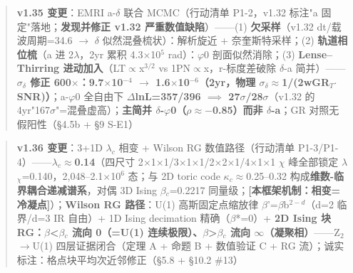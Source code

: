 \documentclass[UTF8,fontset=windows]{csoarticle}
\newcommand{\mtag}[1]{\textbf{[#1]}}
\newcommand{\up}[1]{\ensuremath{^{#1}}}
\newcommand{\down}[1]{\ensuremath{_{#1}}}
\begin{document}
\begin{quote}
\textbf{v1.35 变更}：EMRI a-\ensuremath{\delta} 联合 MCMC（行动清单 P1-2，v1.32 标注"a 固定"落地；\textbf{发现并修正 v1.32 严重数值缺陷}）------(1) \textbf{欠采样}（v1.32 dt/载波周期=34.6 \ensuremath{\to} \ensuremath{\delta} 似然混叠梳状）：解析旋近 + 奈奎斯特采样；(2) \textbf{轨道相位梳}（a 进 2\ensuremath{\lambda}，2yr 累积 4.3\ensuremath{\times}10\up{5} rad）：\ensuremath{\varphi}0 剖面似然消除；(3) \textbf{Lense--Thirring 进动加入}（LT\ensuremath{\propto}x\up{3/2} vs 1PN\ensuremath{\propto}x，r-标度差破除 \ensuremath{\delta}-a 简并）------\textbf{\ensuremath{\sigma}\down{\delta{}} 修正 600\ensuremath{\times}：9.7\ensuremath{\times}10\up{-4} \ensuremath{\to} 1.6\ensuremath{\times}10\up{-6}（2yr，物理 \ensuremath{\sigma}\down{\delta{}}\ensuremath{\approx}1/(2wGR\down{T}\ensuremath{\cdot}SNR)）}；a-\ensuremath{\varphi}0 全自由下 \textbf{\ensuremath{\Delta}lnL=357/396 \ensuremath{\implies} 27\ensuremath{\sigma}/28\ensuremath{\sigma}}（v1.32 的 4yr"167\ensuremath{\sigma}"=混叠虚高）；\textbf{主简并 \ensuremath{\delta}-\ensuremath{\varphi}0（\ensuremath{\rho}\ensuremath{\approx}\ensuremath{-}0.85）而非 \ensuremath{\delta}-a}；GR 对照无假阳性（\S{}4.5b + \S{}9 S-E1）
\end{quote}

\begin{quote}
\textbf{v1.36 变更}：3+1D \ensuremath{\lambda}\down{c} 相变 + Wilson RG 数值路径（行动清单 P1-3/P1-4）------\textbf{\ensuremath{\lambda}\down{c}\ensuremath{\approx}0.14}（四尺寸 2\ensuremath{\times}1\ensuremath{\times}1/3\ensuremath{\times}1\ensuremath{\times}1/2\ensuremath{\times}2\ensuremath{\times}1/4\ensuremath{\times}1\ensuremath{\times}1 \ensuremath{\chi} 峰全部锁定 \ensuremath{\lambda}\down{\chi{}}=0.140，2,048--2.1\ensuremath{\times}10\up{6} 态；与 2D toric code \ensuremath{\kappa}\down{c}\ensuremath{\approx}0.25--0.32 构成\textbf{维数-临界耦合递减谱系}，对偶 3D Ising \ensuremath{\beta}\down{c}=0.2217 同量级；\mtag{本框架机制：相变=冷凝点}）；\textbf{Wilson RG 路径}：U(1) 高斯固定点缩放律 \ensuremath{\beta}'=\ensuremath{\beta}b\up{2-d}（d=2 临界/d=3 IR 自由）+ 1D Ising decimation 精确（\ensuremath{\beta}*=0）+ \textbf{2D Ising 块 RG：\ensuremath{\beta}<\ensuremath{\beta}\down{c} 流向 0（=U(1) 连续极限）、\ensuremath{\beta}>\ensuremath{\beta}\down{c} 流向 \ensuremath{\infty}（凝聚相）}------Z\down{2}\ensuremath{\to}U(1) 四层证据闭合（定理 A + 命题 B + 数值验证 C + RG 流）；诚实标注：格点块平均次近邻修正（\S{}5.8 + \S{}10.2 \#13）
\end{quote}
\end{document}
